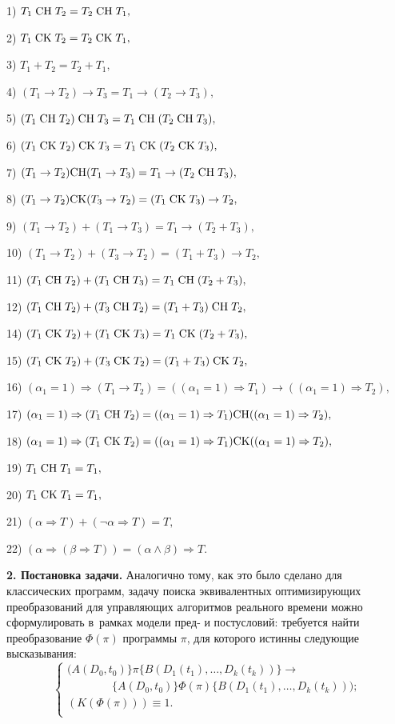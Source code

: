 1) $T_1 \;{\rm CH}\;T_2 =T_2 \;{\rm CH}\;T_1 , $

2) $T_1 \;{\rm CK}\;T_2 =T_2 \;{\rm CK}\;T_1 , $

3) $T_1 +T_2 =T_2 +T_1 , $

4) $(T_1 \to T_2 )\to  T_3 =T_1 \to (T_2 \to  T_3 ), $

5) $(T_1 \;{\rm CH}\;T_2 )\;{\rm CH}\;T_3 =T_1 \;{\rm CH}\;(T_2 \;{\rm CH}\;T_3 ), $

6) $(T_1 \;{\rm CK}\;T_2 )\;{\rm CK}\;T_3 =T_1 \;{\rm CK}\;(T_2 \;{\rm CK}\;T_3 ), $

7) $(T_1 \to T_2 ){\rm CH}(T_1 \to  T_3 )=T_1 \to (T_2 \;{\rm CH}\;T_3 ), $

8) $(T_1 \to T_2 ){\rm CK}(T_3 \to  T_2 )=(T_1 \;{\rm CK}\;T_3 )\to  T_2 , $

9) $(T_1 \to T_2 )+(T_1 \to  T_3 )=T_1 \to (T_2 +T_3 ), $

10) $(T_1 \to T_2 )+(T_3 \to  T_2 )=(T_1 +T_3 )\to  T_2 , $

11) $(T_1 \;{\rm CH}\;T_2 )+(T_1 \;{\rm CH}\;T_3 )=T_1 \;{\rm CH}\;(T_2 +T_3 ), $

12) $(T_1 \;{\rm CH}\;T_2 )+(T_3 \;{\rm CH}\;T_2 )=(T_1 +T_3 )\;{\rm CH}\;T_2 , $

14) $(T_1 \;{\rm CK}\;T_2 )+(T_1 \;{\rm CK}\;T_3 )=T_1 \;{\rm CK}\;(T_2 +T_3 ), $

15) $(T_1 \;{\rm CK}\;T_2 )+(T_3 \;{\rm CK}\;T_2 )=(T_1 +T_3 )\;{\rm CK}\;T_2 , $

16) $(\alpha _1 =1)\Rightarrow (T_1 \to  T_2 )=((\alpha _1 =1)\Rightarrow T_1
)\to  ((\alpha _1 =1)\Rightarrow T_2 ), $

17) $(\alpha _1 =1)\Rightarrow (T_1 \;{\rm CH}\;T_2 )=((\alpha _1 =1)\Rightarrow
T_1 ){\rm CH}((\alpha _1 =1)\Rightarrow T_2 ), $

18) $(\alpha _1 =1)\Rightarrow (T_1 \;{\rm CK}\;T_2 )=((\alpha _1 =1)\Rightarrow
T_1 ){\rm CK}((\alpha _1 =1)\Rightarrow T_2 ), $

19) $T_1 \;{\rm CH}\;T_1 =T_1 , $

20) $T_1 \;{\rm CK}\;T_1 =T_1 , $

21) $(\alpha \Rightarrow T)+(\neg \alpha \Rightarrow T)=T, $

22) $(\alpha \Rightarrow (\beta \Rightarrow T))=(\alpha \wedge \beta
)\Rightarrow T.$

\textbf{2. Постановка задачи.}
Аналогично тому,  как это было сделано для классических
программ,  задачу поиска эквивалентных оптимизирующих преобразований для
управляющих алгоритмов реального времени можно сформулировать в~рамках
модели пред- и постусловий:
требуется найти преобразование $\Phi(\pi )$
программы $\pi $,  для которого истинны следующие высказывания:
\[
\left\{ \begin{array}{l}
 (A(D_0 , t_0 )\}\pi \{B(D_1 (t_1 ), \dots, D_k (t_k ))\}\to  \\
\qquad \qquad \{A(D_0 , t_0 )\}\Phi(\pi)\{B(D_1 (t_1 ), \dots, D_k (t_k ))); \\
 (K(\Phi(\pi )))\equiv 1. \\
 \end{array} \right.
\]

